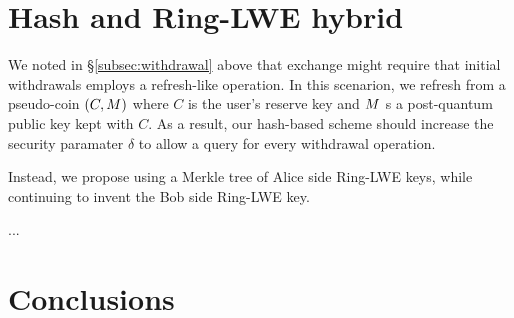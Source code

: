 \documentclass{llncs}
\begin{document}
\section{Hash and Ring-LWE hybrid}

We noted in \S\ref{subsec:withdrawal} above that exchange might
require that initial withdrawals employs a refresh-like operation.
In this scenarion, we refresh from a pseudo-coin $(C,M)$ where
 $C$ is the user's reserve key \cite[??]{Taler} and
 $M$ s a post-quantum public key kept with $C$.
As a result, our hash-based scheme should increase the security
paramater $\delta$ to allow a query for every  withdrawal operation.

Instead, we propose using a Merkle tree of Alice side Ring-LWE keys,
while continuing to invent the Bob side Ring-LWE key.  

...

\section{Conclusions}






\end{document}
